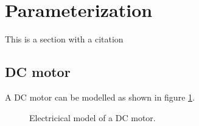 \section{Parameterization}
This is a section with a citation \cite{feedback}

\subsection{DC motor}
A DC motor can be modelled as shown in figure \ref{fig:DCmotor}. 

\begin{figure}[!th]
\centering
\begin{circuitikz}
  
\end{circuitikz}
\caption[DC motor]{Electricical model of a DC motor.}
\label{fig:DCmotor}
\end{figure}